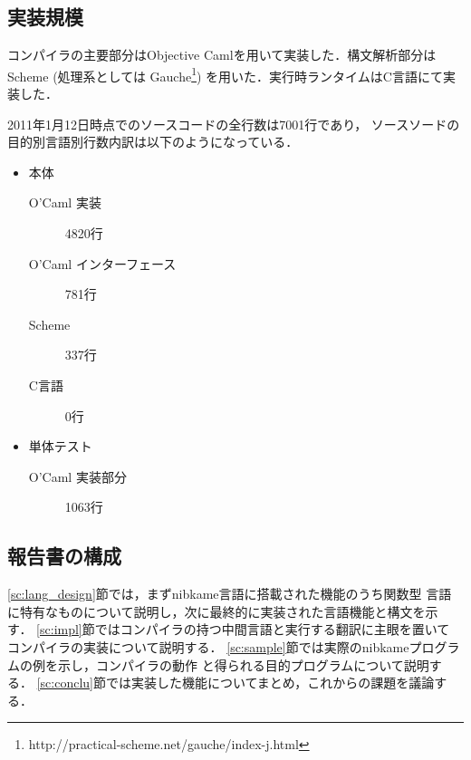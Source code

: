 \documentclass[a4paper,titlepage,report]{jsbook}
\begin{document}
\subsection{実装規模}
コンパイラの主要部分はObjective
Camlを用いて実装した．構文解析部分はScheme
(処理系としては
Gauche\footnote{http://practical-scheme.net/gauche/index-j.html})
を用いた．実行時ランタイムはC言語にて実装した．

2011年1月12日時点でのソースコードの全行数は7001行であり，
ソースソードの目的別言語別行数内訳は以下のようになっている．
\begin{itemize}
 \item 本体
       \begin{description}
	\item[O'Caml 実装] 4820行
	\item[O'Caml インターフェース] 781行
	\item[Scheme] 337行
	\item[C言語] 0行
       \end{description}
 \item 単体テスト
       \begin{description}
	\item[O'Caml 実装部分] 1063行
       \end{description}
\end{itemize}

\subsection{報告書の構成} %
\ref{sc:lang_design}節では，まずnibkame言語に搭載された機能のうち関数型
言語に特有なものについて説明し，次に最終的に実装された言語機能と構文を示
す．
\ref{sc:impl}節ではコンパイラの持つ中間言語と実行する翻訳に主眼を置いて
コンパイラの実装について説明する．
\ref{sc:sample}節では実際のnibkameプログラムの例を示し，コンパイラの動作
と得られる目的プログラムについて説明する．
\ref{sc:conclu}節では実装した機能についてまとめ，これからの課題を議論する．

\mainmatter
\end{document}
